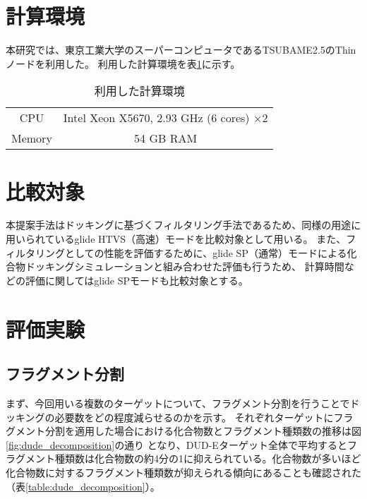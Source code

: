 \section{計算環境}
本研究では、東京工業大学のスーパーコンピュータであるTSUBAME2.5のThinノードを利用した。
利用した計算環境を表\ref{table:computer_node}に示す。

\begin{table}[htb] \centering
	\caption{利用した計算環境}
	\label{table:computer_node}
	\begin{tabular}{cc}
	\hline
	CPU		&Intel Xeon X5670, 2.93 GHz (6 cores) $\times2$ \\
	Memory	& 54 GB RAM \\ \hline 
	\end{tabular}
\end{table}

\section{比較対象}
本提案手法はドッキングに基づくフィルタリング手法であるため、同様の用途に用いられているglide HTVS（高速）モードを比較対象として用いる。
また、フィルタリングとしての性能を評価するために、glide SP（通常）モードによる化合物ドッキングシミュレーションと組み合わせた評価も行うため、
計算時間などの評価に関してはglide SPモードも比較対象とする。

\section{評価実験}

\subsection{フラグメント分割}\label{subsec:result_decomposition}
まず、今回用いる複数のターゲットについて、フラグメント分割を行うことでドッキングの必要数をどの程度減らせるのかを示す。
それぞれターゲットにフラグメント分割を適用した場合における化合物数とフラグメント種類数の推移は図\ref{fig:dude_decomposition}の通り
となり、DUD-Eターゲット全体で平均するとフラグメント種類数は化合物数の約4分の1に抑えられている。化合物数が多いほど
化合物数に対するフラグメント種類数が抑えられる傾向にあることも確認された（表\ref{table:dude_decomposition}）。

